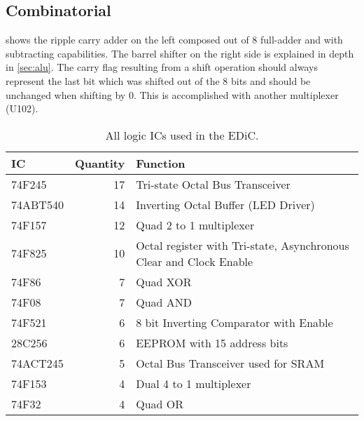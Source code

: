 \subsection{Combinatorial }\label{sec:schALU}
 shows the ripple carry adder on the left composed out of 8 full-adder and with subtracting capabilities.
The barrel shifter on the right side is explained in depth in \cref{sec:alu}.
The carry flag resulting from a shift operation should always represent the last bit which was shifted out of the 8 bits and should be unchanged when shifting by 0.
This is accomplished with another multiplexer (U102).
\begin{table}[t]
  \centering
  \renewcommand{\arraystretch}{1.25}
  \caption{All logic \glspl{IC} used in the \gls{EDiC}.}
  \label{tab:cpuIcs}
  \begin{tabularx}{\textwidth}{ |l|r||X| }
    \hline
    \gls{IC}   & Quantity & Function                                                           \\\hline\hline
    74F245     & 17       & Tri-state Octal Bus Transceiver                                    \\\hline
    74ABT540   & 14       & Inverting Octal Buffer (\gls{LED} Driver)                          \\\hline
    74F157     & 12       & Quad 2 to 1 multiplexer                                            \\\hline
    74F825     & 10       & Octal register with Tri-state, Asynchronous Clear and Clock Enable \\\hline
    74F86      & 7        & Quad XOR                                                           \\\hline
    74F08      & 7        & Quad AND                                                           \\\hline
    74F521     & 6        & 8 bit Inverting Comparator with Enable                             \\\hline
    28C256     & 6        & \gls{EEPROM} with 15 address bits                                  \\\hline
    74ACT245   & 5        & Octal Bus Transceiver used for \gls{SRAM}                          \\\hline
    74F153     & 4        & Dual 4 to 1 multiplexer                                            \\\hline
    74F32      & 4        & Quad OR                                                            \\\hline

\end{tabularx}
\end{table}
